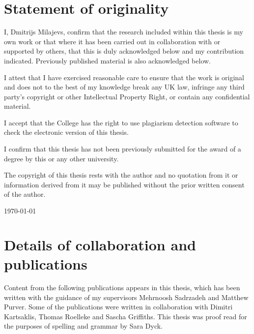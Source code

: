 \chapter*{Statement of originality}

I, Dmitrijs Milajevs, confirm that the research included within this thesis is my own work or that where it has been carried out in collaboration with or supported by others, that this is duly acknowledged below and my contribution indicated. Previously published material is also acknowledged below.

I attest that I have exercised reasonable care to ensure that the work is original and does not to the best of my knowledge break any UK law, infringe any third party’s copyright or other Intellectual Property Right, or contain any confidential material.

I accept that the College has the right to use plagiarism detection software to check the electronic version of this thesis.

I confirm that this thesis has not been previously submitted for the award of a degree by this or any other university.

The copyright of this thesis rests with the author and no quotation from it or information derived from it may be published without the prior written consent of the author.


\today

\chapter*{Details of collaboration and publications}

Content from the following publications appears in this thesis, which has been written with the guidance of my supervisors Mehrnoosh Sadrzadeh and Matthew Purver. Some of the publications were written in collaboration with Dimitri Kartsaklis, Thomas Roelleke and Sascha Griffiths. This thesis was proof read for the purposes of spelling and grammar by Sara Dyck.

